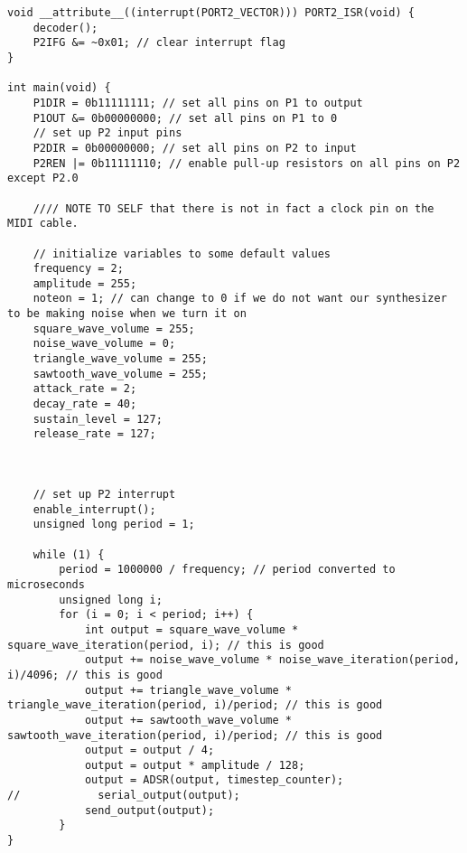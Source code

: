 \begin{lstlisting}[label={lst:lstlisting}]
void __attribute__((interrupt(PORT2_VECTOR))) PORT2_ISR(void) {
    decoder();
    P2IFG &= ~0x01; // clear interrupt flag
}

int main(void) {
    P1DIR = 0b11111111; // set all pins on P1 to output
    P1OUT &= 0b00000000; // set all pins on P1 to 0
    // set up P2 input pins
    P2DIR = 0b00000000; // set all pins on P2 to input
    P2REN |= 0b11111110; // enable pull-up resistors on all pins on P2 except P2.0

    //// NOTE TO SELF that there is not in fact a clock pin on the MIDI cable.

    // initialize variables to some default values
    frequency = 2;
    amplitude = 255;
    noteon = 1; // can change to 0 if we do not want our synthesizer to be making noise when we turn it on
    square_wave_volume = 255;
    noise_wave_volume = 0;
    triangle_wave_volume = 255;
    sawtooth_wave_volume = 255;
    attack_rate = 2;
    decay_rate = 40;
    sustain_level = 127;
    release_rate = 127;



    // set up P2 interrupt
    enable_interrupt();
    unsigned long period = 1;

    while (1) {
        period = 1000000 / frequency; // period converted to microseconds
        unsigned long i;
        for (i = 0; i < period; i++) {
            int output = square_wave_volume * square_wave_iteration(period, i); // this is good
            output += noise_wave_volume * noise_wave_iteration(period, i)/4096; // this is good
            output += triangle_wave_volume * triangle_wave_iteration(period, i)/period; // this is good
            output += sawtooth_wave_volume * sawtooth_wave_iteration(period, i)/period; // this is good
            output = output / 4;
            output = output * amplitude / 128;
            output = ADSR(output, timestep_counter);
//            serial_output(output);
            send_output(output);
        }
}
\end{lstlisting}